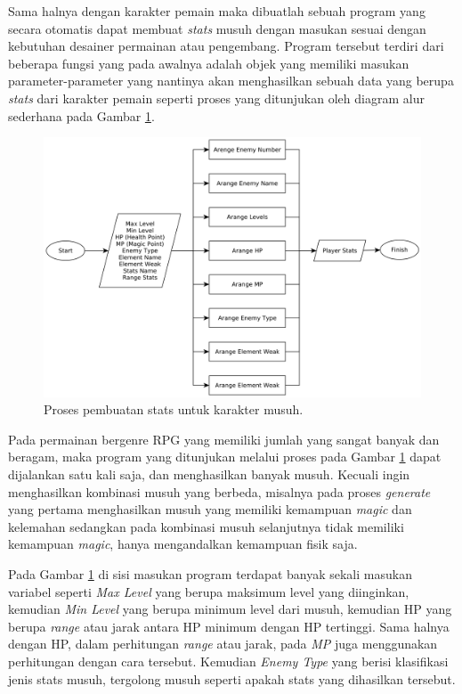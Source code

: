 Sama halnya dengan karakter pemain maka dibuatlah sebuah program yang secara otomatis dapat membuat \textit{stats} musuh dengan masukan sesuai dengan kebutuhan desainer permainan atau pengembang. Program tersebut terdiri dari beberapa fungsi yang pada awalnya adalah objek yang memiliki masukan parameter-parameter yang nantinya akan menghasilkan sebuah data yang berupa \textit{stats} dari karakter pemain seperti proses yang ditunjukan oleh diagram alur sederhana pada Gambar \ref{fig:enemy_stats_generator}.
\vspace{1ex}

\begin{figure} [!h] \centering
	\includegraphics[scale=0.09]{img/enemy_stats_generator.png}
	\caption{Proses pembuatan stats untuk karakter musuh.}
	\label{fig:enemy_stats_generator}
\end{figure}

Pada permainan bergenre RPG yang memiliki jumlah yang sangat banyak dan beragam, maka program yang ditunjukan melalui proses pada Gambar \ref{fig:enemy_stats_generator} dapat dijalankan satu kali saja, dan menghasilkan banyak musuh. Kecuali ingin menghasilkan kombinasi musuh yang berbeda, misalnya pada proses \textit{generate} yang pertama menghasilkan musuh yang memiliki kemampuan \textit{magic} dan kelemahan sedangkan pada kombinasi musuh selanjutnya tidak memiliki kemampuan \textit{magic}, hanya mengandalkan kemampuan fisik saja.
\vspace{1ex}

Pada Gambar \ref{fig:enemy_stats_generator} di sisi masukan program terdapat banyak sekali masukan variabel seperti \textit{Max Level} yang berupa maksimum level yang diinginkan, kemudian \textit{Min Level} yang berupa minimum level dari musuh, kemudian HP yang berupa \textit{range} atau jarak antara HP minimum dengan HP tertinggi. Sama halnya dengan HP, dalam perhitungan \textit{range} atau jarak, pada \textit{MP} juga menggunakan perhitungan dengan cara tersebut. Kemudian \textit{Enemy Type} yang berisi klasifikasi jenis stats musuh, tergolong musuh seperti apakah stats yang dihasilkan tersebut. 
\vspace{1ex}

